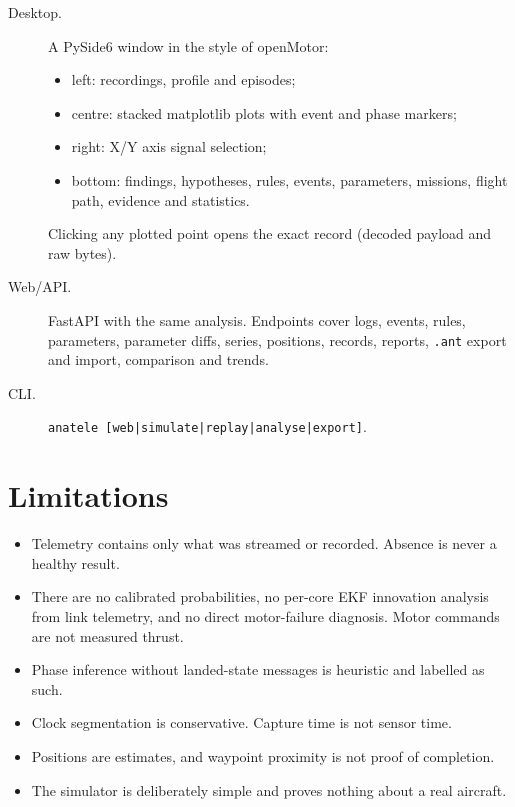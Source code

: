 \documentclass[11pt,a4paper]{article}
\newcommand{\code}[1]{\texttt{#1}}
\begin{document}
\begin{description}
  \item[Desktop.] A PySide6 window in the style of openMotor:
        \begin{itemize}
          \item left: recordings, profile and episodes;
          \item centre: stacked matplotlib plots with event and phase markers;
          \item right: X/Y axis signal selection;
          \item bottom: findings, hypotheses, rules, events, parameters, missions, flight path,
                evidence and statistics.
        \end{itemize}
        Clicking any plotted point opens the exact record (decoded payload and raw bytes).
  \item[Web/API.] FastAPI with the same analysis. Endpoints cover logs, events, rules, parameters,
        parameter diffs, series, positions, records, reports, \code{.ant} export and import,
        comparison and trends.
  \item[CLI.] \code{anatele [web|simulate|replay|analyse|export]}.
\end{description}

\section{Limitations}

\begin{itemize}
  \item Telemetry contains only what was streamed or recorded. Absence is never a healthy result.
  \item There are no calibrated probabilities, no per-core EKF innovation analysis from link
        telemetry, and no direct motor-failure diagnosis. Motor commands are not measured thrust.
  \item Phase inference without landed-state messages is heuristic and labelled as such.
  \item Clock segmentation is conservative. Capture time is not sensor time.
  \item Positions are estimates, and waypoint proximity is not proof of completion.
  \item The simulator is deliberately simple and proves nothing about a real aircraft.
\end{itemize}
\end{document}
